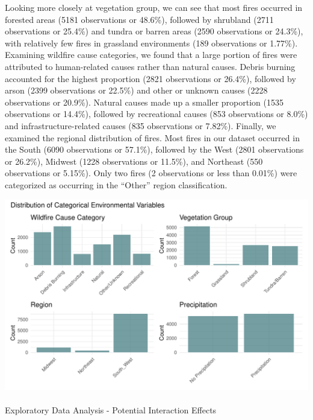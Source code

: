 \documentclass[
  letterpaper,
  DIV=11,
  numbers=noendperiod]{scrartcl}
\makeatletter
\let\oldparagraph\paragraph
\renewcommand{\paragraph}{
    \@ifstar
      \xxxParagraphStar
      \xxxParagraphNoStar
  }
\newcommand{\xxxParagraphStar}[1]{\oldparagraph*{#1}\mbox{}}
\newcommand{\xxxParagraphNoStar}[1]{\oldparagraph{#1}\mbox{}}
\makeatother
\begin{document}
Looking more closely at vegetation group, we can see that most fires
occurred in forested areas (5181 observations or 48.6\%), followed by
shrubland (2711 observations or 25.4\%) and tundra or barren areas (2590
observations or 24.3\%), with relatively few fires in grassland
environments (189 observations or 1.77\%). Examining wildfire cause
categories, we found that a large portion of fires were attributed to
human-related causes rather than natural causes. Debris burning
accounted for the highest proportion (2821 observations or 26.4\%),
followed by arson (2399 observations or 22.5\%) and other or unknown
causes (2228 observations or 20.9\%). Natural causes made up a smaller
proportion (1535 observations or 14.4\%), followed by recreational
causes (853 observations or 8.0\%) and infrastructure-related causes
(835 observations or 7.82\%). Finally, we examined the regional
distribution of fires. Most fires in our dataset occurred in the South
(6090 observations or 57.1\%), followed by the West (2801 observations
or 26.2\%), Midwest (1228 observations or 11.5\%), and Northeast (550
observations or 5.15\%). Only two fires (2 observations or less than
0.01\%) were categorized as occurring in the ``Other'' region
classification.

\includegraphics{written-report_files/figure-pdf/categorical-dist-1.pdf}

\paragraph{Exploratory Data Analysis - Potential Interaction
Effects}\label{exploratory-data-analysis---potential-interaction-effects}
\end{document}
